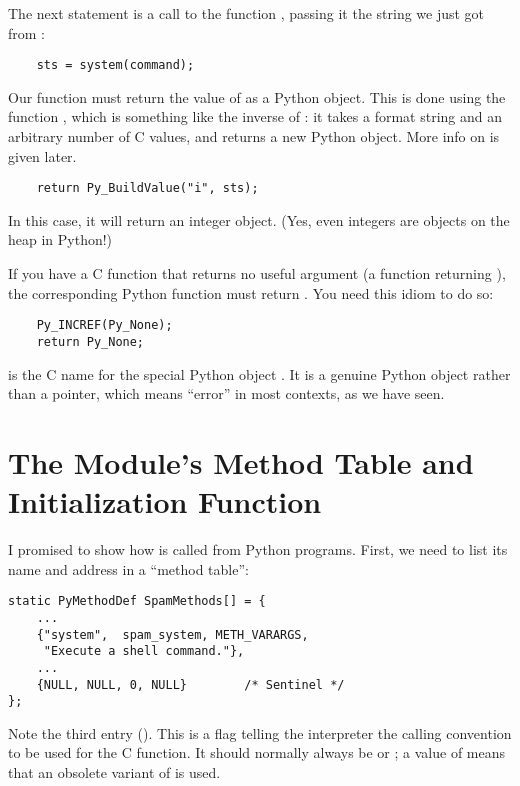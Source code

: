 The next statement is a call to the \UNIX{} function
, passing it the string we just got from
:

\begin{verbatim}
    sts = system(command);
\end{verbatim}

Our  function must return the value of
 as a Python object.  This is done using the function
, which is something like the inverse of
: it takes a format string and an
arbitrary number of C values, and returns a new Python object.
More info on  is given later.

\begin{verbatim}
    return Py_BuildValue("i", sts);
\end{verbatim}

In this case, it will return an integer object.  (Yes, even integers
are objects on the heap in Python!)

If you have a C function that returns no useful argument (a function
returning ), the corresponding Python function must return
.   You need this idiom to do so:

\begin{verbatim}
    Py_INCREF(Py_None);
    return Py_None;
\end{verbatim}

 is the C name for the special Python object
.  It is a genuine Python object rather than a \NULL{}
pointer, which means ``error'' in most contexts, as we have seen.


\section{The Module's Method Table and Initialization Function
         \label{methodTable}}

I promised to show how  is called from Python
programs.  First, we need to list its name and address in a ``method
table'':

\begin{verbatim}
static PyMethodDef SpamMethods[] = {
    ...
    {"system",  spam_system, METH_VARARGS,
     "Execute a shell command."},
    ...
    {NULL, NULL, 0, NULL}        /* Sentinel */
};
\end{verbatim}

Note the third entry ().  This is a flag telling
the interpreter the calling convention to be used for the C
function.  It should normally always be  or
; a value of  means that an
obsolete variant of  is used.

